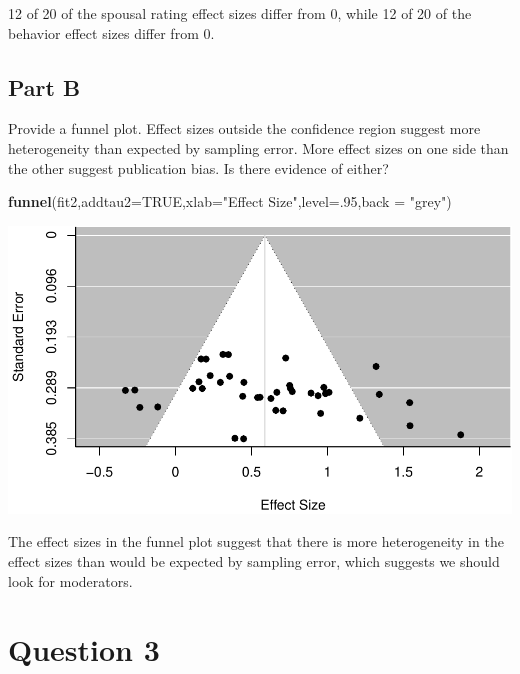 \documentclass[]{article}
\newenvironment{Shaded}{\begin{snugshade}}{\end{snugshade}}
\newcommand{\KeywordTok}[1]{\textcolor[rgb]{0.13,0.29,0.53}{\textbf{#1}}}
\newcommand{\DataTypeTok}[1]{\textcolor[rgb]{0.13,0.29,0.53}{#1}}
\newcommand{\DecValTok}[1]{\textcolor[rgb]{0.00,0.00,0.81}{#1}}
\newcommand{\StringTok}[1]{\textcolor[rgb]{0.31,0.60,0.02}{#1}}
\newcommand{\OtherTok}[1]{\textcolor[rgb]{0.56,0.35,0.01}{#1}}
\newcommand{\NormalTok}[1]{#1}
\begin{document}
12 of 20 of the spousal rating effect sizes differ from 0, while 12 of
20 of the behavior effect sizes differ from 0.

\subsection{Part B}\label{part-b-1}

Provide a funnel plot. Effect sizes outside the confidence region
suggest more heterogeneity than expected by sampling error. More effect
sizes on one side than the other suggest publication bias. Is there
evidence of either?

\begin{Shaded}
\begin{Highlighting}[]
\KeywordTok{funnel}\NormalTok{(fit2,}\DataTypeTok{addtau2=}\OtherTok{TRUE}\NormalTok{,}\DataTypeTok{xlab=}\StringTok{"Effect Size"}\NormalTok{,}\DataTypeTok{level=}\NormalTok{.}\DecValTok{95}\NormalTok{,}\DataTypeTok{back =} \StringTok{"grey"}\NormalTok{)}
\end{Highlighting}
\end{Shaded}

\begin{center}\includegraphics{Beck_HW_9_R_1_files/figure-latex/unnamed-chunk-7-1} \end{center}

The effect sizes in the funnel plot suggest that there is more
heterogeneity in the effect sizes than would be expected by sampling
error, which suggests we should look for moderators.

\section{Question 3}\label{question-3}
\end{document}
